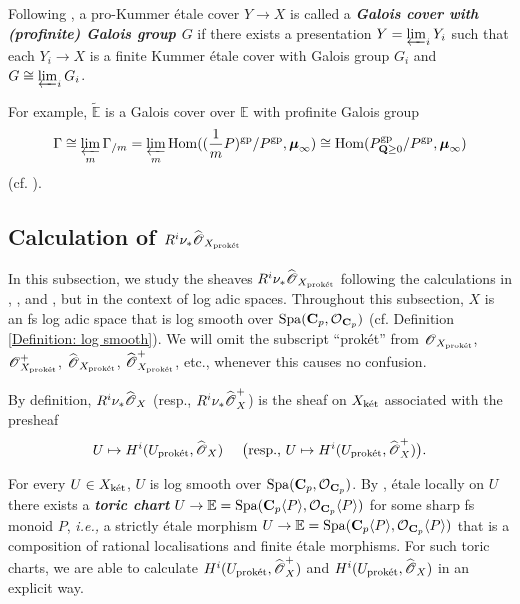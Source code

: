 Following \cite[Definition 6.1.2]{Diao}, a pro-Kummer \'{e}tale cover $Y\rightarrow X$ is called a \textit{\textbf{Galois cover with (profinite) Galois group $G$}} if there exists a presentation $Y=\varprojlim_{i} Y_i$ such that each $Y_i\rightarrow X$ is a finite Kummer \'{e}tale cover with Galois group $G_i$ and $G\cong \varprojlim_i G_i$.

For example, $\widetilde{\mathbb{E}}$ is a Galois cover over $\mathbb{E}$ with profinite Galois group \[\Gamma\cong \varprojlim_m \Gamma_{/m}=\varprojlim_m \operatorname{Hom}((\frac{1}{m}P)^{\mathrm{gp}}/P^{\mathrm{gp}}, \boldsymbol{\mu}_{\infty}) \cong\operatorname{Hom}(P^{\mathrm{gp}}_{\operatorname{\mathbf{Q}}\geq 0}/P^{\mathrm{gp}}, \boldsymbol{\mu}_{\infty})\]
(cf. \cite[(6.1.4)]{Diao}).


\subsection{Calculation of \texorpdfstring{$R^i\nu_*\widehat{\operatorname{\mathscr{O}}}_{X_{\operatorname{\textrm{prok\'{e}t}}}}$}{Lg}}\label{subsection: main result}
In this subsection, we study the sheaves $R^i\nu_*\widehat{\operatorname{\mathscr{O}}}_{X_{\operatorname{\textrm{prok\'{e}t}}}}$ following the calculations in \cite{Scholze-perfectoid-survey},  \cite{Scholze_2013}, and \cite{CHJ-2017}, but in the context of log adic spaces. Throughout this subsection, $X$ is an fs log adic space that is log smooth over $\operatorname{Spa}(\operatorname{\mathbf{C}}_p, \operatorname{\mathcal{O}}_{\operatorname{\mathbf{C}}_p})$ (cf. Definition \ref{Definition: log smooth}). We will omit the subscript ``prok\'et'' from $\operatorname{\mathscr{O}}_{X_{\operatorname{\textrm{prok\'{e}t}}}}$, $\operatorname{\mathscr{O}}^+_{X_{\operatorname{\textrm{prok\'{e}t}}}}$, $\widehat{\operatorname{\mathscr{O}}}_{X_{\operatorname{\textrm{prok\'{e}t}}}}$, $\widehat{\operatorname{\mathscr{O}}}^+_{X_{\operatorname{\textrm{prok\'{e}t}}}}$, etc., whenever this causes no confusion.

By definition, $R^i\nu_*\widehat{\operatorname{\mathscr{O}}}_{X}$ (resp., $R^i\nu_*\widehat{\operatorname{\mathscr{O}}}^+_{X}$) is the sheaf on $X_{\operatorname{\textrm{k\'{e}t}}}$ associated with the presheaf 
\[U\mapsto H^i(U_{\operatorname{\textrm{prok\'{e}t}}}, \widehat{\operatorname{\mathscr{O}}}_{X})\,\,\,\,\,\,\,\,\big(\textrm{resp., }U\mapsto H^i(U_{\operatorname{\textrm{prok\'{e}t}}}, \widehat{\operatorname{\mathscr{O}}}^+_{X})\big).\]

For every $U\in X_{\operatorname{\textrm{k\'{e}t}}}$, $U$ is log smooth over $\operatorname{Spa}(\operatorname{\mathbf{C}}_p, \operatorname{\mathcal{O}}_{\operatorname{\mathbf{C}}_p})$. By \cite[Proposition 3.1.10]{Diao}, \'etale locally on $U$ there exists a \textit{\textbf{toric chart}} $U\rightarrow \mathbb{E}=\operatorname{Spa}(\operatorname{\mathbf{C}}_p\langle P\rangle, \operatorname{\mathcal{O}}_{\operatorname{\mathbf{C}}_p}\langle P\rangle)$ for some sharp fs monoid $P$,  {\it i.e.,} a strictly \'etale morphism $U\rightarrow \mathbb{E}=\operatorname{Spa}(\operatorname{\mathbf{C}}_p\langle P\rangle, \operatorname{\mathcal{O}}_{\operatorname{\mathbf{C}}_p}\langle P\rangle)$ that is a composition of rational localisations and finite \'etale morphisms. For such toric charts, we are able to calculate $H^i(U_{\operatorname{\textrm{prok\'{e}t}}}, \widehat{\operatorname{\mathscr{O}}}^+_{X})$ and $H^i(U_{\operatorname{\textrm{prok\'{e}t}}}, \widehat{\operatorname{\mathscr{O}}}_{X})$ in an explicit way.


